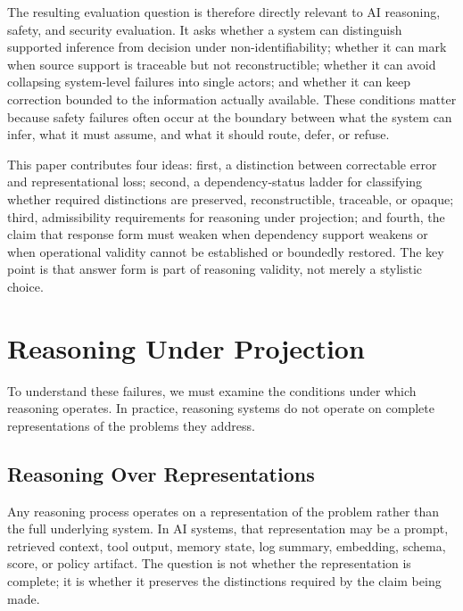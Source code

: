 \documentclass[11pt]{article}
\begin{document}
The resulting evaluation question is therefore directly relevant to AI reasoning, safety, and security evaluation. It asks whether a system can distinguish supported inference from decision under non-identifiability; whether it can mark when source support is traceable but not reconstructible; whether it can avoid collapsing system-level failures into single actors; and whether it can keep correction bounded to the information actually available. These conditions matter because safety failures often occur at the boundary between what the system can infer, what it must assume, and what it should route, defer, or refuse.

This paper contributes four ideas: first, a distinction between correctable error and representational loss; second, a dependency-status ladder for classifying whether required distinctions are preserved, reconstructible, traceable, or opaque; third, admissibility requirements for reasoning under projection; and fourth, the claim that response form must weaken when dependency support weakens or when operational validity cannot be established or boundedly restored. The key point is that answer form is part of reasoning validity, not merely a stylistic choice.

\section{Reasoning Under Projection}

To understand these failures, we must examine the conditions under which reasoning operates. In practice, reasoning systems do not operate on complete representations of the problems they address.

\subsection{Reasoning Over Representations}

Any reasoning process operates on a representation of the problem rather than the full underlying system. In AI systems, that representation may be a prompt, retrieved context, tool output, memory state, log summary, embedding, schema, score, or policy artifact. The question is not whether the representation is complete; it is whether it preserves the distinctions required by the claim being made.
\end{document}
